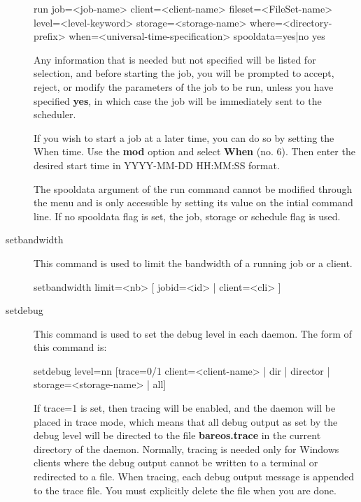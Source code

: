 \begin{description}
run job={\textless}job-name{\textgreater} client={\textless}client-name{\textgreater}
  fileset={\textless}FileSet-name{\textgreater}  level={\textless}level-keyword{\textgreater}
  storage={\textless}storage-name{\textgreater}  where={\textless}directory-prefix{\textgreater}
  when={\textless}universal-time-specification{\textgreater} spooldata=yes|no yes

   Any information that is needed but not specified will be listed for
   selection, and before starting the job, you will be prompted to accept,
   reject, or modify the parameters of the job to be run, unless you have
   specified {\bf yes}, in which case the job will be immediately sent to
   the scheduler.

   If you wish to start a job at a later time, you can do so by setting  the When
   time. Use the {\bf mod} option and select {\bf When} (no. 6).  Then enter the
   desired start time in YYYY-MM-DD HH:MM:SS format.

   The spooldata argument of the run command cannot be modified through the menu
   and is only accessible by setting its value on the intial command line. If
   no spooldata flag is set, the job, storage or schedule flag is used.

\item[setbandwidth]
  This command is used to limit the bandwidth of a running job or a client.

setbandwidth limit=<nb> [ jobid=<id> | client=<cli> ]

\item [setdebug]
   This command is used to set the debug level in each  daemon. The form of this
   command is:

setdebug level=nn [trace=0/1 client={\textless}client-name{\textgreater} | dir | director |
  storage={\textless}storage-name{\textgreater} | all]

   If trace=1 is set, then tracing will be enabled, and the daemon will be
   placed in trace mode, which means that all debug output as set by the
   debug level will be directed to the file {\bf bareos.trace} in the
   current directory of the daemon.  Normally, tracing is needed only for
   Windows clients where the debug output cannot be written to a terminal or
   redirected to a file.  When tracing, each debug output message is
   appended to the trace file.  You must explicitly delete the file when
   you are done.


\end{description}
